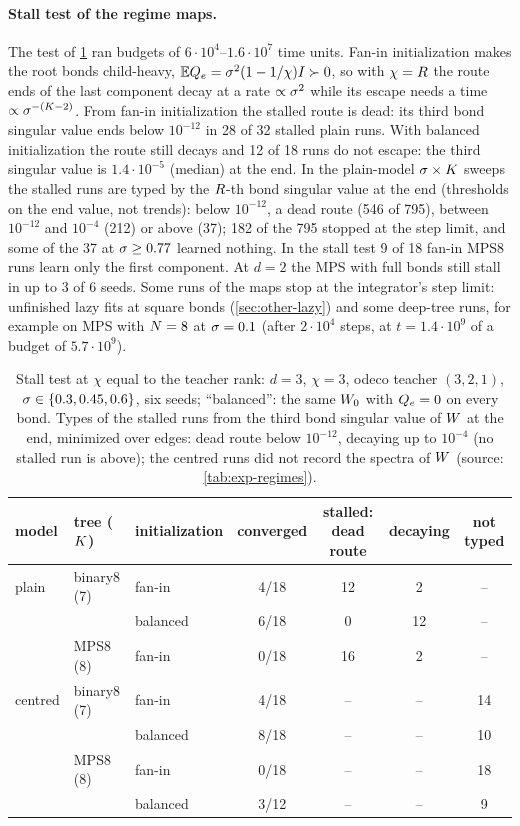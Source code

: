 \paragraph{Stall test of the regime maps.}
\empirical{} The test of \cref{tab:stall-test} ran budgets of $6\cdot10^4$--$1.6\cdot10^7$ time units. Fan-in
initialization makes the root bonds child-heavy, $\mathbb{E}Q_{e}=\sigma^2(1-1/\chi)I\succ0$, so with $\chi=R$ the route
ends of the last component decay at a rate $\propto\sigma^2$ while its escape needs a time $\propto\sigma^{-(K-2)}$. From
fan-in initialization the stalled route is dead: its third bond singular value ends below $10^{-12}$ in 28 of 32
stalled plain runs. With balanced initialization the route still decays and 12 of 18 runs do not escape: the third
singular value is $1.4\cdot10^{-5}$ (median) at the end. In the plain-model $\sigma\times K$ sweeps the stalled runs are
typed by the $R$-th bond singular value at the end (thresholds on the end value, not trends): below
$10^{-12}$, a dead route (546 of 795), between $10^{-12}$ and $10^{-4}$ (212) or above (37); 182 of the 795 stopped
at the step limit, and some of the 37 at $\sigma\ge0.77$ learned nothing. In the stall test 9 of 18 fan-in MPS8 runs
learn only the first component. At $d=2$ the
MPS with full bonds still stall in up to 3 of 6 seeds. Some runs of the maps stop at the integrator's step limit:
unfinished lazy fits at square bonds (\cref{sec:other-lazy}) and some deep-tree runs, for example on MPS with $N=8$
at $\sigma=0.1$ (after $2\cdot10^4$ steps, at $t=1.4\cdot10^9$ of a budget of $5.7\cdot10^9$).

\begin{table}[tbp]
  \centering
  \caption{Stall test at $\chi$ equal to the teacher rank: $d=3$, $\chi=3$, odeco teacher $(3,2,1)$,
    $\sigma\in\{0.3,0.45,0.6\}$, six seeds; ``balanced'': the same $W_{0}$ with $Q_{e}=0$ on every bond. Types of the stalled
    runs from the third bond singular value of $W$ at the end, minimized over edges: dead route below $10^{-12}$,
    decaying up to $10^{-4}$ (no stalled run is above); the centred runs did not record the spectra of $W$
    (source: \cref{tab:exp-regimes}).}
  \label{tab:stall-test}
  \footnotesize
  \begin{tabular}{@{}lllcccc@{}}
    \toprule
    model & tree ($K$) & initialization & converged & stalled: dead route & decaying & not typed \\
    \midrule
    plain   & binary8 (7) & fan-in   & 4/18 & 12 & 2  & -- \\
            &             & balanced & 6/18 & 0  & 12 & -- \\
            & MPS8 (8)    & fan-in   & 0/18 & 16 & 2  & -- \\
    centred & binary8 (7) & fan-in   & 4/18 & -- & -- & 14 \\
            &             & balanced & 8/18 & -- & -- & 10 \\
            & MPS8 (8)    & fan-in   & 0/18 & -- & -- & 18 \\
            &             & balanced & 3/12 & -- & -- & 9 \\
    \bottomrule
  \end{tabular}
\end{table}

